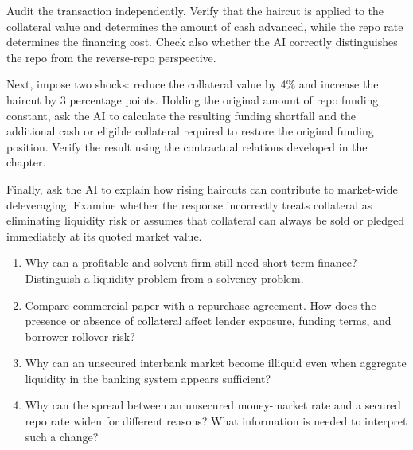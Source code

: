 Audit the transaction independently. Verify that the haircut is applied to the collateral value and determines the amount of cash advanced, while the repo rate determines the financing cost. Check also whether the AI correctly distinguishes the repo from the reverse-repo perspective.

Next, impose two shocks: reduce the collateral value by 4\% and increase the haircut by 3 percentage points. Holding the original amount of repo funding constant, ask the AI to calculate the resulting funding shortfall and the additional cash or eligible collateral required to restore the original funding position. Verify the result using the contractual relations developed in the chapter.

Finally, ask the AI to explain how rising haircuts can contribute to market-wide deleveraging. Examine whether the response incorrectly treats collateral as eliminating liquidity risk or assumes that collateral can always be sold or pledged immediately at its quoted market value.



\begin{enumerate}

\item Why can a profitable and solvent firm still need short-term finance? Distinguish a liquidity problem from a solvency problem.

\item Compare commercial paper with a repurchase agreement. How does the presence or absence of collateral affect lender exposure, funding terms, and borrower rollover risk?

\item Why can an unsecured interbank market become illiquid even when aggregate liquidity in the banking system appears sufficient?

\item Why can the spread between an unsecured money-market rate and a secured repo rate widen for different reasons? What information is needed to interpret such a change?

\end{enumerate}


